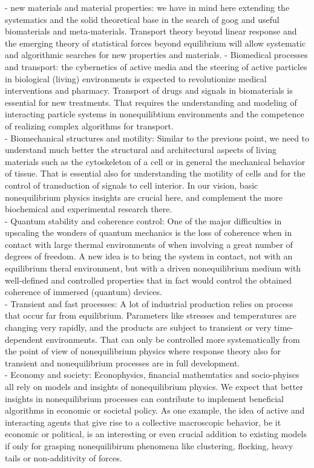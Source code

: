 - new materials and material properties: we have in mind here extending the systematics and the solid theoretical base in the search of goog and useful biomaterials and meta-materials.  Transport theory beyond linear response and the emerging theory of statistical forces beyond equilibrium will allow systematic and algorithmic searches for new properties and materials.
- Biomedical processes and transport:  the cybernetics of active media and the steering of active particles in biological (living) environments is expected to revolutionize medical interventions and pharmacy.  Transport of drugs and signals in biomaterials is essential for new treatments.  That requires the understanding and modeling of interacting particle systems in nonequilibtium environments and the competence of realizing complex algorithms for transport.\\
- Biomechanical structures and motility: Similar to the previous point, we need to understand much better the structural and architectural aspects of living materials such as the cytoskeleton of a cell or in general the mechanical behavior of tissue.  That is essential also for understanding the motility of cells and for the control of transduction of signals to cell interior.  In our vision, basic nonequilibrium physics insights are crucial here, and complement the more biochemical and experimental research there.\\
- Quantum stability and coherence control: One of the major difficulties in upscaling the wonders of quantum mechanics is the loss of coherence when in contact with large thermal environments of when involving a great number of degrees of freedom.  A new idea is to bring the system in contact, not with an equilibrium theral environment, but with a driven nonequilibrium medium with well-defined and controlled properties that in fact would control the obtained coherence of immersed (quantum) devices.\\
- Transient and fast processes: A lot of industrial production relies on process that occur far from equilibrium.  Parameters like stresses and temperatures are changing very rapidly, and the products are subject to transient or very time-dependent environments. That can only be controlled more systematically from the point of view of nonequilibrium physics where response theory also for transient and nonequilibrium processes are in full development.\\
- Economy and society:  Econophysics, financial mathemtatics and socio-phyiscs all rely on models and insights of nonequilibrium physics. We expect that better insights in nonequilibrium processes can contribute to implement beneficial algorithms in economic or societal policy.  As one example, the idea of active and interacting agents that give rise to a collective macroscopic behavior, be it economic or political, is an interesting or even crucial addition to existing models if only for grasping nonequilibirum phenomena like clustering, flocking, heavy tails or non-additivity of forces.\\
